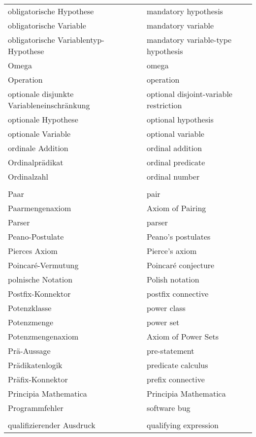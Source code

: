 \begin{longtabu}   { @{} X[l] X[l] }
    obligatorische Hypothese & mandatory hypothesis \\
    obligatorische Variable & mandatory variable \\
    \hangindent=0.5cm obligatorische Variablentyp-{\allowbreak}Hypothese\vspace{2pt} & mandatory variable-{\allowbreak}type hypothesis \\
    Omega & omega \\
    Operation & operation \\
    \hangindent=0.5cm optionale disjunkte Variableneinschränkung\vspace{2pt} & optional disjoint-{\allowbreak}variable restriction \\
    optionale Hypothese & optional hypothesis \\
    optionale Variable & optional variable \\
    ordinale Addition & ordinal addition \\
    Ordinalprädikat & ordinal predicate \\
    Ordinalzahl & ordinal number \\
     & \\
    Paar & pair \\
    Paarmengenaxiom & Axiom of Pairing \\
    Parser & parser \\
    Peano-Postulate & Peano's postulates \\
    Pierces Axiom & Pierce's axiom \\
    Poincaré-Vermutung & Poincaré conjecture \\
    polnische Notation & Polish notation \\
    Postfix-Konnektor & postfix connective \\
    Potenzklasse & power class \\
    Potenzmenge & power set \\
    Potenzmengenaxiom & Axiom of Power Sets  \\
    Prä-Aussage & pre-statement \\
    Prädikatenlogik & predicate calculus \\
    Präfix-Konnektor & prefix connective \\
    Principia Mathematica & Principia Mathematica \\
    Programmfehler & software bug \\
     & \\
    qualifizierender Ausdruck & qualifying expression \\

\end{longtabu}
